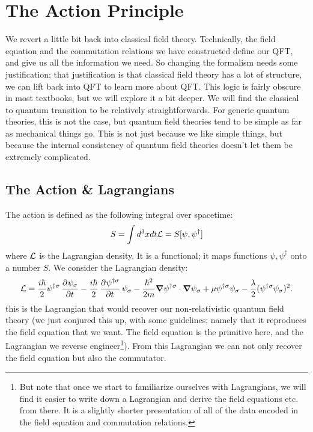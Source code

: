 \section{The Action Principle}
We revert a little bit back into classical field theory. Technically, the field equation and the commutation relations we have constructed define our QFT, and give us all the information we need. So changing the formalism needs some justification; that justification is that classical field theory has a lot of structure, we can lift back into QFT to learn more about QFT. This logic is fairly obscure in most textbooks, but we will explore it a bit deeper. We will find the classical to quantum transition to be relatively straightforwards. For generic quantum theories, this is not the case, but quantum field theories tend to be simple as far as mechanical things go. This is not just because we like simple things, but because the internal consistency of quantum field theories doesn't let them be extremely complicated.

\subsection{The Action \& Lagrangians}
The action is defined as the following integral over spacetime:
\begin{equation}
    S = \int d^3x dt \mathcal{L} = S[\psi, \psi^\dagger]
\end{equation}
where $\mathcal{L}$ is the Lagrangian density. It is a functional; it maps functions $\psi, \psi^\dag$ onto a number $S$. We consider the Lagrangian density:
\begin{equation}
    \L = \frac{i\hbar}{2}\psi^{\dag\sigma}\dpd{\psi_\sigma}{t} - \frac{i\hbar}{2}\dpd{\psi^{\dag\sigma}}{t}\psi_\sigma - \frac{\hbar^2}{2m}\nabla \psi^{\dag\sigma} \cdot \nabla \psi_\sigma + \mu \psi^{\dag\sigma}\psi_\sigma - \frac{\lambda}{2}(\psi^{\dag\sigma}\psi_\sigma)^2.
\end{equation}
this is the Lagrangian that would recover our non-relativistic quantum field theory (we just conjured this up, with some guidelines; namely that it reproduces the field equation that we want. The field equation is the primitive here, and the Lagrangian we reverse engineer\footnote{But note that once we start to familiarize ourselves with Lagrangians, we will find it easier to write down a Lagrangian and derive the field equations etc. from there. It is a slightly shorter presentation of all of the data encoded in the field equation and commutation relations.}). From this Lagrangian we can not only recover the field equation but also the commutator.

